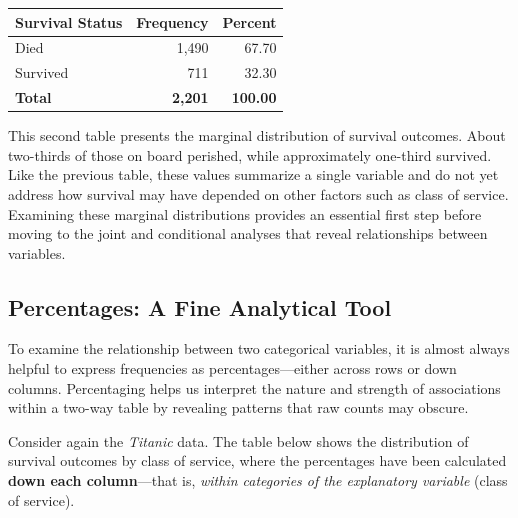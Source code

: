 \documentclass[
  letterpaper,
  DIV=11,
  numbers=noendperiod]{scrreprt}
\begin{document}
\begin{longtable}[]{@{}lrr@{}}
\toprule\noalign{}
\textbf{Survival Status} & \textbf{Frequency} & \textbf{Percent} \\
\midrule\noalign{}
\endhead
\bottomrule\noalign{}
\endlastfoot
Died & 1,490 & 67.70 \\
Survived & 711 & 32.30 \\
\textbf{Total} & \textbf{2,201} & \textbf{100.00} \\
\end{longtable}

This second table presents the marginal distribution of survival
outcomes. About two-thirds of those on board perished, while
approximately one-third survived. Like the previous table, these values
summarize a single variable and do not yet address how survival may have
depended on other factors such as class of service. Examining these
marginal distributions provides an essential first step before moving to
the joint and conditional analyses that reveal relationships between
variables.

\subsection{Percentages: A Fine Analytical
Tool}\label{percentages-a-fine-analytical-tool}

To examine the relationship between two categorical variables, it is
almost always helpful to express frequencies as percentages---either
across rows or down columns. Percentaging helps us interpret the nature
and strength of associations within a two-way table by revealing
patterns that raw counts may obscure.

Consider again the \emph{Titanic} data. The table below shows the
distribution of survival outcomes by class of service, where the
percentages have been calculated \textbf{down each column}---that is,
\emph{within categories of the explanatory variable} (class of service).
\end{document}
